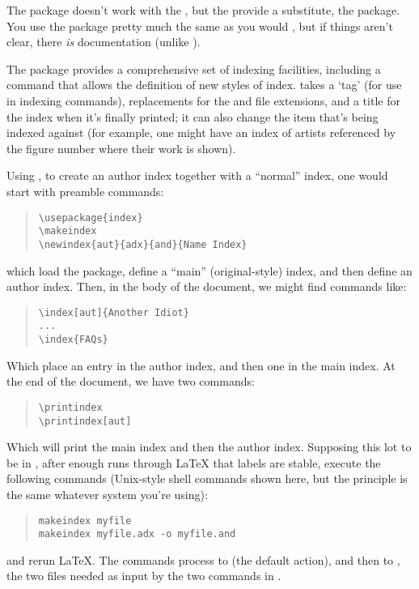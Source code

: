 The  package doesn't work with the %
, but the  provide a
substitute, the  package.  You use the
 package pretty much the same as you would
, but if things aren't clear, there \emph{is}
documentation (unlike ).

The  package provides a comprehensive set of indexing
facilities, including a  command that allows the
definition of new styles of index.   takes a `tag' (for
use in indexing commands), replacements for the  and
 file extensions, and a title for the index when it's
finally printed; it can also change the item that's being indexed
against (for example, one might have an index of artists referenced by
the figure number where their work is shown).

Using , to create an author index together with a
``normal'' index, one would start with preamble commands:
\begin{quote}
\begin{verbatim}
\usepackage{index}
\makeindex
\newindex{aut}{adx}{and}{Name Index}
\end{verbatim}
\end{quote}
which load the package, define a ``main'' (original-style) index, and
then define an author index.  Then, in the body of the document, we
might find commands like:
\begin{quote}
\begin{verbatim}
\index[aut]{Another Idiot}
...
\index{FAQs}
\end{verbatim}
\end{quote}
Which place an entry in the author index, and then one in the main
index.  At the end of the document, we have two commands:
\begin{quote}
\begin{verbatim}
\printindex
\printindex[aut]
\end{verbatim}
\end{quote}
Which will print the main index and then the author index.  Supposing
this lot to be in , after enough runs through
\LaTeX{} that labels are stable, execute the following commands
(Unix-style shell commands shown here, but the principle is the same
whatever system you're using):
\begin{quote}
\begin{verbatim}
makeindex myfile
makeindex myfile.adx -o myfile.and
\end{verbatim}
\end{quote}
and rerun \LaTeX{}.  The  commands process
 to  (the default action), and then
 to , the two files needed as input
by the two  commands in .

